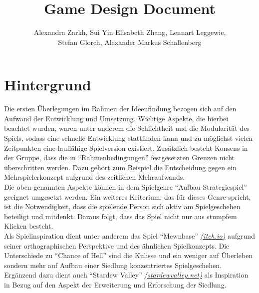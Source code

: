 \documentclass[paper=A4,pagesize=auto,12pt,headinclude=true,footinclude=true,BCOR=0mm,DIV=calc]{scrartcl}
\title{Game Design Document}
\author{Alexandra Zarkh, Sui Yin Elisabeth Zhang, Lennart Leggewie,\\ Stefan Glorch, Alexander Markus Schallenberg}
\begin{document}
	
\begin{titlepage}
	\maketitle
\end{titlepage}


\tableofcontents
\newpage

\section{Hintergrund}\label{sec:Hintergrund}




Die ersten Überlegungen im Rahmen der Ideenfindung bezogen sich auf den Aufwand der Entwicklung und Umsetzung. Wichtige Aspekte, die hierbei beachtet wurden, waren unter anderem die Schlichtheit und die Modularität des Spiels, sodass eine schnelle Entwicklung stattfinden kann und zu möglichst vielen Zeitpunkten eine lauffähige Spielversion existiert. Zusätzlich besteht Konsens in der Gruppe, dass die in \hyperref[sec:Rahmenbedingungen]{"`Rahmenbedingungen"'} festgesetzten Grenzen nicht überschritten werden. Dazu gehört zum Beispiel die Entscheidung gegen ein Mehrspielerkonzept aufgrund des zeitlichen Mehraufwands.\\
Die oben genannten Aspekte können in dem Spielgenre "`Aufbau-Strategiespiel"' geeignet umgesetzt werden. Ein weiteres Kriterium, das für dieses Genre spricht, ist die Notwendigkeit, dass die spielende Person sich aktiv am Spielgeschehen beteiligt und mitdenkt. Daraus folgt, dass das Spiel nicht nur aus stumpfem Klicken besteht.\\
Als Spielinspiration dient unter anderem das Spiel "`Mewnbase"' \hyperref{https://cairn4.itch.io/mewnbase}{}{}{\textit{(itch.io)}}  aufgrund seiner orthographischen Perspektive und des ähnlichen Spielkonzepts. Die Unterschiede zu "`Chance of Hell"' sind die Kulisse und ein weniger auf Überleben sondern mehr auf Aufbau einer Siedlung konzentriertes Spielgeschehen.\\
Ergänzend dazu dient auch "`Stardew Valley"' \hyperref{https://www.stardewvalley.net/}{}{}{\textit{(stardewvalley.net)}} als Inspiration in Bezug auf den Aspekt der Erweiterung und Erforschung der Siedlung.
\end{document}
